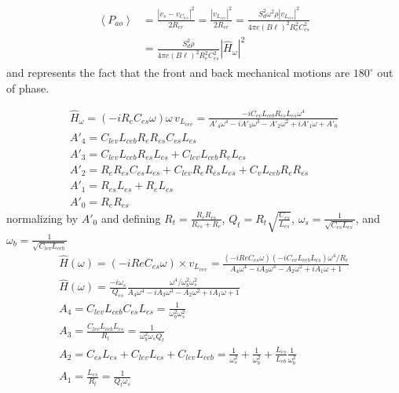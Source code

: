 \documentclass[10pt]{book}
\begin{document}
\begin{align}
\begin{split}
\left\langle P_{ao} \right\rangle &=\frac{\left| v_s -v_{C_{lev}} \right|^2}{2R_{er}}=\frac{\left| v_{L_{cev}} \right|^2}{2R_{er}}=\frac{S_d^2 \omega^2 \rho\left| v_{L_{cev}} \right|^2}{4\pi c (B \ell)^2R_{e}^2C_{es}^2}\\
&=\frac{S_d^2 \rho}{4\pi c (B \ell)^2R_{e}^2C_{es}^2}\left| \hat{H}_\omega \right|^2
\end{split}
\end{align}
and represents the fact that the front and back mechanical motions are $180^\circ$ out of phase.



\begin{align}
\hat{H}_\omega=(-i R_e C_{es} \omega) \omega \, v_{L_{cev}}= \frac{
-i  C_{ev} L_{ceb} R_{es} L_{es} \omega^4}
{A'_4\omega^4-iA'_3\omega^3-A'_2\omega^2+iA'_1\omega+A'_0}\\
A'_4=C_{lev} L_{ceb} R_e R_{es}  C_{es} L_{es}\\
A'_3=C_{lev} L_{ceb} R_{es} L_{es}
+ C_{lev} L_{ceb} R_e L_{es}\\
A'_2=R_e R_{es}  C_{es} L_{es}+C_{lev} R_e R_{es} L_{es}+C_v L_{ceb} R_e R_{es}\\
A'_1=R_{es} L_{es}+R_e L_{es}\\
A'_0=R_e R_{es}
\end{align}
normalizing by $A'_0$ and defining $R_t=\frac{R_eR_{es}}{R_{es}+R_e}$, $Q_{t}=R_t\sqrt{\frac{C_{es}}{L_{es}}}$, $\omega_s=\frac{1}{\sqrt{C_{es}L_{es}}}$, and $\omega_b=\frac{1}{\sqrt{C_{lev}L_{ceb}}}$
\begin{align}
\hat{H}(\omega)=(-i Re C_{es} \omega) \times v_{L_{cev}}= \frac{
(-i Re C_{es} \omega)(-i  C_{ev} L_{ceb} L_{es}) \omega^4/R_e}
{A_4\omega^4-iA_3\omega^3-A_2\omega^2+iA_1\omega+1}\\
\hat{H}(\omega)= \frac{-i\omega_s}{Q_{es}}\frac{\omega^4/\omega_b^2 \omega_s^2}
{A_4\omega^4-iA_3\omega^3-A_2\omega^2+iA_1\omega+1}\\
A_4=C_{lev} L_{ceb} C_{es} L_{es}=\frac{1}{\omega_b^2\omega_s^2}\\
A_3=\frac{C_{lev} L_{ceb} L_{es}}{R_t}=\frac{1}{\omega_b^2\omega_s Q_{t}}\\
A_2=C_{es} L_{es}+C_{lev} L_{es}+C_{lev} L_{ceb}=\frac{1}{\omega_s^2}+\frac{1}{\omega_b^2}+\frac{L_{es}}{L_{eb}}\frac{1}{\omega_b^2}\\
A_1=\frac{L_{es}}{R_t}=\frac{1}{Q_{t}\omega_s}
\end{align}
\end{document}
